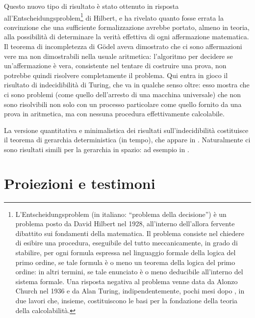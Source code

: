 Questo nuovo tipo di risultato è stato ottenuto in risposta all'Entscheidungsproblem\footnote{L'Entscheidungsproblem (in italiano: ``problema della decisione'') è un problema posto da David Hilbert nel 1928, all'interno dell'allora fervente dibattito sui fondamenti della matematica. Il problema consiste nel chiedere di esibire una procedura, eseguibile del tutto meccanicamente, in grado di stabilire, per ogni formula espressa nel linguaggio formale della logica del primo ordine, se tale formula è o meno un teorema della logica del primo ordine: in altri termini, se tale enunciato è o meno deducibile all'interno del sistema formale. Una risposta negativa al problema venne data da Alonzo Church nel 1936 \cite{Church1936} e da Alan Turing, indipendentemente, pochi mesi dopo \cite{Turing1936}, in due lavori che, insieme, costituiscono le basi per la fondazione della teoria della calcolabilità.} di Hilbert, e ha rivelato quanto fosse errata la convinzione che una sufficiente formalizzazione avrebbe portato, almeno in teoria, alla possibilità di determinare la verità effettiva di ogni affermazione matematica. Il teorema di incompletezza di Gödel aveva dimostrato che ci sono affermazioni vere ma non dimostrabili nella usuale aritmetica: l'algoritmo per decidere se un'affermazione è vera, consistente nel tentare di costruire una prova, non potrebbe quindi risolvere completamente il problema. Qui entra in gioco il risultato di indecidibilità di Turing, che va in qualche senso oltre: esso mostra che ci sono problemi (come quello dell'arresto di una macchina universale) che non sono risolvibili non solo con un processo particolare come quello fornito da una prova in aritmetica, ma con nessuna procedura effettivamente calcolabile.

La versione quantitativa e minimalistica dei risultati sull'indecidibilità costituisce il teorema di gerarchia deterministica (in tempo), che appare in \cite{Hartmanis1965}. Naturalmente ci sono risultati simili per la gerarchia in spazio: ad esempio in \cite{HopcroftUllman1979}.

\section{Proiezioni e testimoni}

